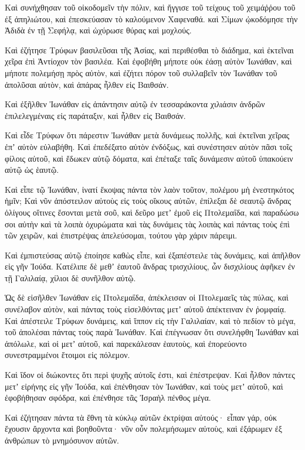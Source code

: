 {Καὶ συνήχθησαν τοῦ οἰκοδομεῖν τὴν πόλιν, καὶ ἤγγισε τοῦ τείχους τοῦ χειμάῤῥου τοῦ ἐξ ἀπηλιώτου, καὶ ἐπεσκεύασαν τὸ καλούμενον Χαφεναθά.
καὶ Σίμων ᾠκοδόμησε τὴν Ἀδιδὰ ἐν τῇ Σεφήλᾳ, καὶ ὠχύρωσε θύρας καὶ μοχλούς.
\par }{\PP {}Καὶ ἐζήτησε Τρύφων βασιλεῦσαι τῆς Ἀσίας, καὶ περιθέσθαι τὸ διάδημα, καὶ ἐκτεῖναι χεῖρα ἐπὶ Ἀντίοχον τὸν βασιλέα.
Καὶ ἐφοβήθη μήποτε οὐκ ἐάσῃ αὐτὸν Ἰωνάθαν, καὶ μήποτε πολεμήσῃ πρὸς αὐτὸν, καὶ ἐζήτει πόρον τοῦ συλλαβεῖν τὸν Ἰωνάθαν τοῦ ἀπολῦσαι αὐτὸν, καὶ ἀπάρας ἦλθεν εἰς Βαιθσάν.
\par }{\PP {}Καὶ ἐξῆλθεν Ἰωνάθαν εἰς ἀπάντησιν αὐτῷ ἐν τεσσαράκοντα χιλιάσιν ἀνδρῶν ἐπιλελεγμέναις εἰς παράταξιν, καὶ ἦλθεν εἰς Βαιθσάν.
\par }{\PP {}Καὶ εἶδε Τρύφων ὅτι πάρεστιν Ἰωνάθαν μετὰ δυνάμεως πολλῆς, καὶ ἐκτεῖναι χεῖρας ἐπʼ αὐτὸν εὐλαβήθη.
Καὶ ἐπεδέξατο αὐτὸν ἐνδόξως, καὶ συνέστησεν αὐτὸν πᾶσι τοῖς φίλοις αὐτοῦ, καὶ ἔδωκεν αὐτῷ δόματα, καὶ ἐπέταξε ταῖς δυνάμεσιν αὐτοῦ ὑπακούειν αὐτῷ ὡς ἑαυτῷ.
\par }{\PP {}Καὶ εἶπε τῷ Ἰωνάθαν, ἱνατί ἔκοψας πάντα τὸν λαὸν τοῦτον, πολέμου μὴ ἐνεστηκότος ἡμῖν;
Καὶ νῦν ἀπόστειλον αὐτοὺς εἰς τοὺς οἴκους αὐτῶν, ἐπίλεξαι δὲ σεαυτῷ ἄνδρας ὀλίγους οἵτινες ἔσονται μετὰ σοῦ, καὶ δεῦρο μετʼ ἐμοῦ εἰς Πτολεμαΐδα, καὶ παραδώσω σοι αὐτὴν καὶ τὰ λοιπὰ ὀχυρώματα καὶ τὰς δυνάμεις τὰς λοιπὰς καὶ πάντας τοὺς ἐπὶ τῶν χειρῶν, καὶ ἐπιστρέψας ἀπελεύσομαι, τούτου γὰρ χάριν πάρειμι.
\par }{\PP {}Καὶ ἐμπιστεύσας αὐτῷ ἐποίησε καθὼς εἶπε, καὶ ἐξαπέστειλε τὰς δυνάμεις, καὶ ἀπῆλθον εἰς γῆν Ἰούδα.
Κατέλιπε δὲ μεθʼ ἑαυτοῦ ἄνδρας τρισχιλίους, ὧν δισχιλίους ἀφῆκεν ἐν τῇ Γαλιλαίᾳ, χίλιοι δὲ συνῆλθον αὐτῷ.
\par }{\PP {}Ὡς δὲ εἰσῆλθεν Ἰωνάθαν εἰς Πτολεμαΐδα, ἀπέκλεισαν οἱ Πτολεμαεῖς τὰς πύλας, καὶ συνέλαβον αὐτὸν, καὶ πάντας τοὺς εἰσελθόντας μετʼ αὐτοῦ ἀπέκτειναν ἐν ῥομφαίᾳ.
Καὶ ἀπέστειλε Τρύφων δυνάμεις, καὶ ἵππον εἰς τὴν Γαλιλαίαν, καὶ τὸ πεδίον τὸ μέγα, τοῦ ἀπολέσαι πάντας τοὺς παρὰ Ἰωνάθαν.
Καὶ ἐπέγνωσαν ὅτι συνελήφθη Ἰωνάθαν καὶ ἀπόλωλε, καὶ οἱ μετʼ αὐτοῦ, καὶ παρεκάλεσαν ἑαυτοὺς, καὶ ἐπορεύοντο συνεστραμμένοι ἕτοιμοι εἰς πόλεμον.
\par }{\PP {}Καὶ ἴδον οἱ διώκοντες ὅτι περὶ ψυχῆς αὐτοῖς ἐστι, καὶ ἐπέστρεψαν.
Καὶ ἦλθον πάντες μετʼ εἰρήνης εἰς γῆν Ἰούδα, καὶ ἐπένθησαν τὸν Ἰωνάθαν, καὶ τοὺς μετʼ αὐτοῦ, καὶ ἐφοβήθησαν σφόδρα, καὶ ἐπένθησε τᾶς Ἰσραὴλ πένθος μέγα.
\par }{\PP {}Καὶ ἐζήτησαν πάντα τὰ ἔθνη τὰ κύκλῳ αὐτῶν ἐκτρίψαι αὐτούς· εἶπαν γάρ, οὐκ ἔχουσιν ἄρχοντα καὶ βοηθοῦντα· νῦν οὖν πολεμήσωμεν αὐτοὺς, καὶ ἐξάρωμεν ἐξ ἀνθρώπων τὸ μνημόσυνον αὐτῶν.

}
